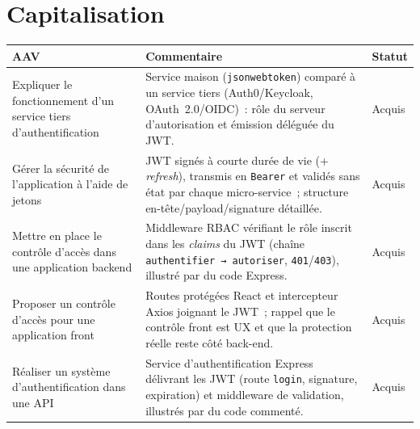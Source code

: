 \newpage

\section*{Capitalisation}

\begin{center}
\setlength{\tabcolsep}{10pt}

\begin{tabular}{|p{}|p{}|m{}|}
\hline
\textbf{AAV} & \textbf{Commentaire} & \textbf{Statut} \\ \hline

Expliquer le fonctionnement d'un service tiers d'authentification &
Service maison (\texttt{jsonwebtoken}) comparé à un service tiers (Auth0/Keycloak, OAuth~2.0/OIDC)~: rôle du serveur d'autorisation et émission déléguée du JWT. &
{\color{green!60!black}Acquis} \\ \hline

Gérer la sécurité de l'application à l'aide de jetons &
JWT signés à courte durée de vie (+ \textit{refresh}), transmis en \texttt{Bearer} et validés sans état par chaque micro-service~; structure en-tête/payload/signature détaillée. &
{\color{green!60!black}Acquis} \\ \hline

Mettre en place le contrôle d'accès dans une application backend &
Middleware RBAC vérifiant le rôle inscrit dans les \textit{claims} du JWT (chaîne \texttt{authentifier → autoriser}, \texttt{401}/\texttt{403}), illustré par du code Express. &
{\color{green!60!black}Acquis} \\ \hline

Proposer un contrôle d'accès pour une application front &
Routes protégées React et intercepteur Axios joignant le JWT~; rappel que le contrôle front est UX et que la protection réelle reste côté back-end. &
{\color{green!60!black}Acquis} \\ \hline

Réaliser un système d'authentification dans une API &
Service d'authentification Express délivrant les JWT (route \texttt{login}, signature, expiration) et middleware de validation, illustrés par du code commenté. &
{\color{green!60!black}Acquis} \\ \hline

\end{tabular}
\end{center}

